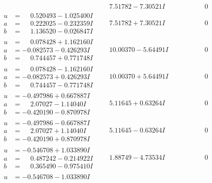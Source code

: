\documentclass[1p]{elsarticle_modified}
\theoremstyle{definition}
\begin{document}
$$\begin{array}{c|c|c}
 & \phantom{-}7.51782 - 7.30521 I & \phantom{-0.000000 } 0 \\ \hline\begin{aligned}
u &= \phantom{-}0.520493 - 1.025400 I \\
a &= \phantom{-}0.222025 - 0.232359 I \\
b &= \phantom{-}1.136520 - 0.026847 I\end{aligned}
 & \phantom{-}7.51782 + 7.30521 I & \phantom{-0.000000 } 0 \\ \hline\begin{aligned}
u &= \phantom{-}0.078428 + 1.162160 I \\
a &= -0.082573 - 0.426293 I \\
b &= \phantom{-}0.744457 + 0.771748 I\end{aligned}
 & \phantom{-}10.00370 - 5.64491 I & \phantom{-0.000000 } 0 \\ \hline\begin{aligned}
u &= \phantom{-}0.078428 - 1.162160 I \\
a &= -0.082573 + 0.426293 I \\
b &= \phantom{-}0.744457 - 0.771748 I\end{aligned}
 & \phantom{-}10.00370 + 5.64491 I & \phantom{-0.000000 } 0 \\ \hline\begin{aligned}
u &= -0.497986 + 0.667887 I \\
a &= \phantom{-}2.07027 - 1.14040 I \\
b &= -0.420190 - 0.870978 I\end{aligned}
 & \phantom{-}5.11645 + 0.63264 I & \phantom{-0.000000 } 0 \\ \hline\begin{aligned}
u &= -0.497986 - 0.667887 I \\
a &= \phantom{-}2.07027 + 1.14040 I \\
b &= -0.420190 + 0.870978 I\end{aligned}
 & \phantom{-}5.11645 - 0.63264 I & \phantom{-0.000000 } 0 \\ \hline\begin{aligned}
u &= -0.546708 + 1.033890 I \\
a &= \phantom{-}0.487242 - 0.214922 I \\
b &= \phantom{-}0.365490 - 0.975410 I\end{aligned}
 & \phantom{-}1.88749 - 4.73534 I & \phantom{-0.000000 } 0 \\ \hline\begin{aligned}
u &= -0.546708 - 1.033890 I \\

\end{aligned}
\end{array}$$
\end{document}
